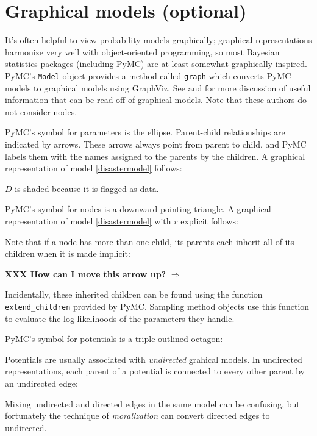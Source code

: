\section{Graphical models (optional)}
\label{sec:graphical}

It's often helpful to view probability models graphically; graphical representations harmonize very well with object-oriented programming, so most Bayesian statistics packages (including PyMC) are at least somewhat graphically inspired. PyMC's \texttt{Model} object provides a method called \texttt{graph} which converts PyMC models to graphical models using GraphViz. See \cite{dawidmarkov} and \cite{jordangraphical} for more discussion of useful information that can be read off of graphical models. Note that these authors do not consider nodes.

PyMC's symbol for parameters is the ellipse. Parent-child relationships are indicated by arrows. These arrows always point from parent to child, and PyMC labels them with the names assigned to the parents by the children. A graphical representation of model \ref{disastermodel} follows:
\begin{center}
\end{center} 
$D$ is shaded because it is flagged as data.

PyMC's symbol for nodes is a downward-pointing triangle. A graphical representation of model \ref{disastermodel} with $r$ explicit follows:
\begin{center}
\end{center}
Note that if a node has more than one child, its parents each inherit all of its children when it is made implicit:
\begin{center}
     \textbf{XXX How can I move this arrow up?} $\Rightarrow$ 
\end{center}
Incidentally, these inherited children can be found using the function \texttt{extend\_children} provided by PyMC. Sampling method objects use this function to evaluate the log-likelihoods of the parameters they handle.

PyMC's symbol for potentials is a triple-outlined octagon:
\begin{center}
\end{center}
Potentials are usually associated with \emph{undirected} grahical models. In undirected representations, each parent of a potential is connected to every other parent by an undirected edge:
\begin{center}
\end{center}
Mixing undirected and directed edges in the same model can be confusing, but fortunately the technique of \emph{moralization} can convert directed edges to undirected.

